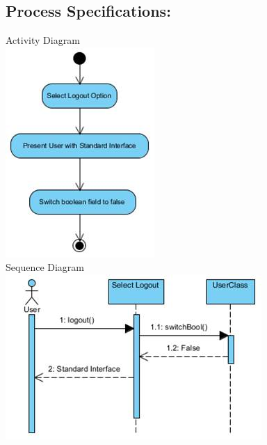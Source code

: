\documentclass[a4paper,11pt]{article}
\begin{document}
\subsection{Process Specifications:} 
Activity Diagram\\
\includegraphics[width=1\linewidth]{./Images/CRUDThread/Diagrams/19.jpg}\\
Sequence Diagram\\
\includegraphics[width=1\linewidth]{./Images/CRUDThread/Diagrams/20.jpg}\\
\end{document}
